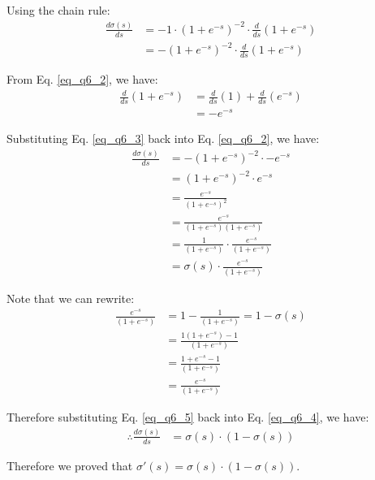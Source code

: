 Using the chain rule:
\begin{align}
    \frac{d \sigma(s)}{d s} &= -1 \cdot (1+e^{-s})^{-2} \cdot \frac{d}{d s} (1+e^{-s}) \nonumber \\
    &= -(1+e^{-s})^{-2} \cdot \frac{d}{d s} (1+e^{-s})
    \label{eq_q6_2}
\end{align}

From Eq. \ref{eq_q6_2}, we have:
\begin{align}
    \frac{d}{d s} (1+e^{-s}) &= \frac{d}{d s} (1) + \frac{d}{d s} (e^{-s}) \nonumber \\
    &= -e^{-s}
    \label{eq_q6_3}
\end{align}

Substituting Eq. \ref{eq_q6_3} back into Eq. \ref{eq_q6_2}, we have:
\begin{align}
    \frac{d \sigma(s)}{d s} &= -(1+e^{-s})^{-2} \cdot -e^{-s} \nonumber \\
    &= (1+e^{-s})^{-2} \cdot e^{-s} \nonumber \\
    &= \frac{e^{-s}}{(1+e^{-s})^2} \nonumber \\
    &= \frac{e^{-s}}{(1+e^{-s})(1+e^{-s})} \nonumber \\
    &= \frac{1}{(1+e^{-s})} \cdot \frac{e^{-s}}{(1+e^{-s})} \nonumber \\
    &= \sigma(s) \cdot \frac{e^{-s}}{(1+e^{-s})}
    \label{eq_q6_4}
\end{align}

Note that we can rewrite:
\begin{align} \label{eq_q6_5}
    \frac{e^{-s}}{(1+e^{-s})} &= 1 - \frac{1}{(1+e^{-s})} = 1 - \sigma (s)  \\
    &= \frac{1(1+e^{-s}) - 1}{(1+e^{-s})} \nonumber \\
    &= \frac{1+e^{-s} - 1}{(1+e^{-s})} \nonumber \\
    &= \frac{e^{-s}}{(1+e^{-s})} \nonumber
\end{align}

Therefore substituting Eq. \ref{eq_q6_5} back into Eq. \ref{eq_q6_4}, we have:
\begin{align}
    \therefore \frac{d \sigma(s)}{d s} &= \sigma(s) \cdot (1 - \sigma (s))
    \label{eq_q6_6}
\end{align}

Therefore we proved that $\sigma'(s) = \sigma(s) \cdot (1-\sigma (s))$.